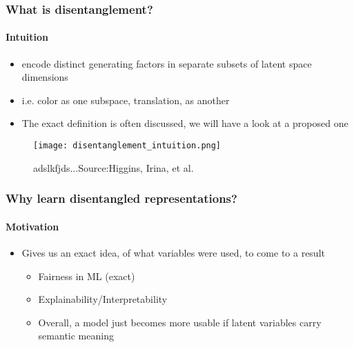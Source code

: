 \documentclass[9pt]{beamer}
\begin{document}
\begin{frame}
\frametitle{What is disentanglement?}
\framesubtitle{Intuition}
	\begin{itemize}%
	\item encode distinct generating factors in separate subsets of latent space dimensions
	\item i.e. color as one subspace, translation, as another
	\item The exact definition is often discussed, we will have a look at a proposed one
	\end{itemize}
\begin{figure}
\texttt{[image: disentanglement\_intuition.png]}
\caption{adslkfjds...Source:Higgins, Irina, et al. }
\end{figure}
\end{frame} 





\begin{frame}
\frametitle{Why learn disentangled representations?}
\framesubtitle{Motivation}
\begin{itemize}%
	\item Gives us an exact idea, of what variables were used, to come to a result
	\begin{itemize}
			\item Fairness in ML (exact)
			\item Explainability/Interpretability
			\item Overall, a model just becomes more usable if latent variables carry semantic meaning		
	\end{itemize}

\end{itemize}
\end{frame} 
\end{document}
